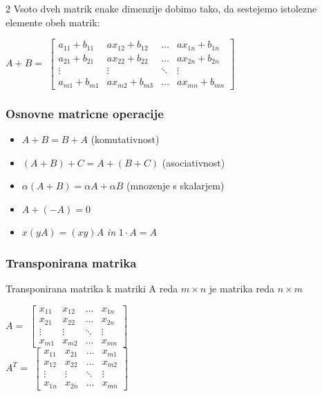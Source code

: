 \documentclass{article}
\begin{document}
\begin{multicols}{2}
	Vsoto dveh matrik enake dimenzije dobimo tako,
	da sestejemo istolezne elemente obeh matrik:
	\begin{center}
		$A + B =$
		$\begin{bmatrix}
				a_{11} + b_{11} & ax_{12} + b_{12} & \dots  & ax_{1n} + b_{1n} \\
				a_{21} + b_{21} & ax_{22} + b_{22} & \dots  & ax_{2n} + b_{2n} \\
				\vdots          & \vdots           & \ddots & \vdots           \\
				a_{m1} + b_{m1} & ax_{m2} + b_{m3} & \dots  & ax_{mn} + b_{mn}
			\end{bmatrix}$
	\end{center}

	\subsubsection{Osnovne matricne operacije}

	\begin{itemize}
		\item $A + B = B + A$ (komutativnost)
		\item $(A + B) + C = A + (B + C)$ (asociativnost)
		\item $\alpha(A + B) = \alpha A + \alpha B$ (mnozenje s skalarjem)
		\item $A + (-A) = 0$
		\item $x(yA) = (xy)A$ \textit{in} $1 \cdot A = A$
	\end{itemize}

	\subsubsection{Transponirana matrika}

	Transponirana matrika k matriki A reda $m \times n$
	je matrika reda $n \times m$
	\begin{center}
		$A =$
		$\begin{bmatrix}
				x_{11} & x_{12} & \dots  & x_{1n} \\
				x_{21} & x_{22} & \dots  & x_{2n} \\
				\vdots & \vdots & \ddots & \vdots \\
				x_{m1} & x_{m2} & \dots  & x_{mn}
			\end{bmatrix}$\\
		\smallskip
		$A^{T} =$
		$\begin{bmatrix}
				x_{11} & x_{21} & \dots  & x_{m1} \\
				x_{12} & x_{22} & \dots  & x_{m2} \\
				\vdots & \vdots & \ddots & \vdots \\
				x_{1n} & x_{2n} & \dots  & x_{mn}
			\end{bmatrix}$
	\end{center}


\end{multicols}
\end{document}
